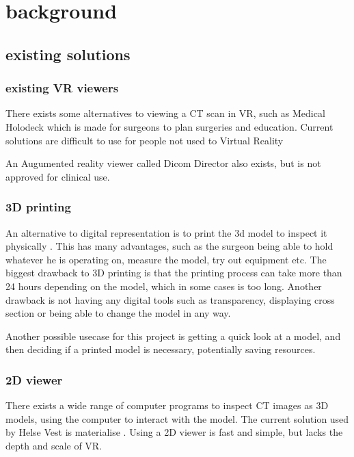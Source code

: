 \documentclass[11pt]{article}
\begin{document}
\section{ background }
\subsection{ existing solutions}

\subsubsection{existing VR viewers}

There exists some alternatives to viewing a CT scan in VR, such as Medical Holodeck \cite{holodeck} which is made for surgeons to plan surgeries and education. Current solutions are difficult to use for people not used to Virtual Reality \emph{}

An Augumented reality viewer called Dicom Director also exists, but is not approved for clinical use. \cite{dicomdirector}


\subsubsection { 3D printing }

An alternative to digital representation is to print the 3d model to inspect it physically \cite{virtualplanningand3dprinting}. This has many advantages, such as the surgeon being able to hold whatever he is operating on, measure the model, try out equipment etc. 
The biggest drawback to 3D printing is that the printing process can take more than 24 hours depending on the model, which in some cases is too long. Another drawback is not having any digital tools such as transparency, displaying cross section or being able to change the model in any way.

Another possible usecase for this project is getting a quick look at a model, and then deciding if a printed model is necessary, potentially saving resources.

\subsubsection {2D viewer}

There exists a wide range of computer programs to inspect CT images as 3D models, using the computer to interact with the model. 
The current solution used by Helse Vest is materialise \cite{materialise}. Using a 2D viewer is fast and simple, but lacks the depth and scale of VR.




\printbibliography
\end{document}

